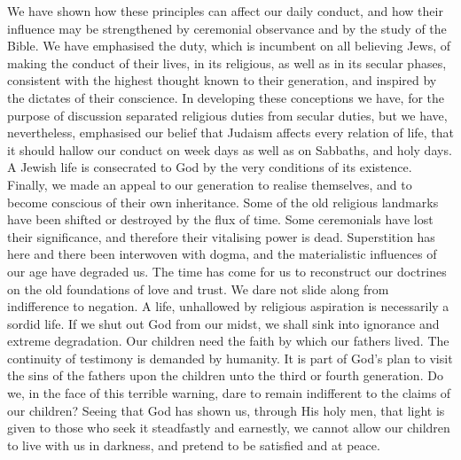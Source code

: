 We have shown how these principles can
affect our daily conduct, and how their
influence may be strengthened by ceremonial
observance and by the study of the
Bible. We have emphasised the duty, which
is incumbent on all believing Jews, of making
the conduct of their lives, in its religious,
as well as in its secular phases, consistent
with the highest thought known to their
generation, and inspired by the dictates of
their conscience. In developing these
conceptions we have, for the purpose of discussion
separated religious duties from secular
duties, but we have, nevertheless, emphasised
our belief that Judaism affects every relation
of life, that it should hallow our conduct on
week days as well as on Sabbaths, and holy
days. A Jewish life is consecrated to God
by the very conditions of its existence.
Finally, we made an appeal to our generation
to realise themselves, and to become
conscious of their own inheritance. Some
of the old religious landmarks have been
shifted or destroyed by the flux of time.
Some ceremonials have lost their significance,
and therefore their vitalising power is dead.
Superstition has here and there been interwoven
with dogma, and the materialistic
influences of our age have degraded us. The
time has come for us to reconstruct our
doctrines on the old foundations of love and trust.
We dare not slide along from indifference
to negation. A life, unhallowed by religious
aspiration is necessarily a sordid life. If
we shut out God from our midst, we shall
sink into ignorance and extreme degradation.
Our children need the faith by which
our fathers lived. The continuity of testimony
is demanded by humanity. It is part
of God’s plan to visit the sins of the fathers
upon the children unto the third or fourth
generation. Do we, in the face of this
terrible warning, dare to remain indifferent
to the claims of our children? Seeing that
God has shown us, through His holy men,
that light is given to those who seek it
steadfastly and earnestly, we cannot allow
our children to live with us in darkness, and
pretend to be satisfied and at peace.

